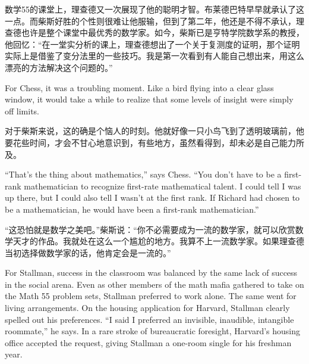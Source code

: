 \ifdefined\chs
数学55的课堂上，理查德又一次展现了他的聪明才智。布莱德巴特早早就承认了这一点。而柴斯好胜的个性则很难让他服输，但到了第二年，他还是不得不承认，理查德也许是整个课堂中最优秀的数学家。如今，柴斯已是亨特学院数学系的教授，他回忆：“在一堂实分析的课上，理查德想出了一个关于复测度的证明，那个证明实际上是借鉴了变分法里的一些技巧。我是第一次看到有人能自己想出来，用这么漂亮的方法解决这个问题的。”
\fi

\ifdefined\eng
For Chess, it was a troubling moment. Like a bird flying into a clear glass window, it would take a while to realize that some levels of insight were simply off limits.
\fi

\ifdefined\chs
对于柴斯来说，这的确是个恼人的时刻。他就好像一只小鸟飞到了透明玻璃前，他要花些时间，才会不甘心地意识到，有些地方，虽然看得到，却未必是自己能力所及。
\fi

\ifdefined\eng
``That's the thing about mathematics,'' says Chess. ``You don't have to be a first-rank mathematician to recognize first-rate mathematical talent. I could tell I was up there, but I could also tell I wasn't at the first rank. If Richard had chosen to be a mathematician, he would have been a first-rank mathematician.''
\fi

\ifdefined\chs
“这恐怕就是数学之美吧。”柴斯说：“你不必需要成为一流的数学家，就可以欣赏数学天才的作品。我就处在这么一个尴尬的地方。我算不上一流数学家。如果理查德当初选择做数学家的话，他肯定会是一流的。”
\fi

\ifdefined\eng
For Stallman, success in the classroom was balanced by the same lack of success in the social arena. Even as other members of the math mafia gathered to take on the Math 55 problem sets, Stallman preferred to work alone. The same went for living arrangements. On the housing application for Harvard, Stallman clearly spelled out his preferences. ``I said I preferred an invisible, inaudible, intangible roommate,'' he says. In a rare stroke of bureaucratic foresight, Harvard's housing office accepted the request, giving Stallman a one-room single for his freshman year.
\fi

